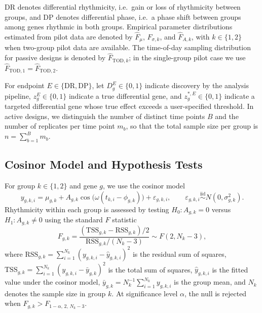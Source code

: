 \documentclass{article}
\begin{document}
DR denotes differential rhythmicity, i.e.\ gain or loss of rhythmicity between
groups, and DP denotes differential phase, i.e.\ a phase shift between groups
among genes rhythmic in both groups. Empirical parameter distributions
estimated from pilot data are denoted by $\hat{F}_\mu$,
$\hat{F}_{\sigma,k}$, and $\hat{F}_{A,k}$, with $k\in\{1,2\}$ when two-group
pilot data are available. The time-of-day sampling distribution for passive
designs is denoted by $\hat{F}_{\mathrm{TOD},k}$; in the single-group pilot
case we use $\hat{F}_{\mathrm{TOD},1}=\hat{F}_{\mathrm{TOD},2}$.

For endpoint $E\in\{\mathrm{DR},\mathrm{DP}\}$, let $D_g^E\in\{0,1\}$
indicate discovery by the analysis pipeline, $z_g^E\in\{0,1\}$ indicate a
true differential gene, and $z_g^{*,E}\in\{0,1\}$ indicate a targeted
differential gene whose true effect exceeds a user-specified threshold.
In active designs, we distinguish the number of distinct time points $B$ and
the number of replicates per time point $m_b$, so that the total sample size
per group is $n=\sum_{b=1}^B m_b.$

\subsection{Cosinor Model and Hypothesis Tests}
\label{sec:cosinor_tests}

For group $k\in\{1,2\}$ and gene $g$, we use the cosinor model
\begin{equation}
y_{g,k,i}
=
\mu_{g,k}
+
A_{g,k}\cos\!\bigl(\omega(t_{k,i}-\phi_{g,k})\bigr)
+
\varepsilon_{g,k,i},
\qquad
\varepsilon_{g,k,i}\overset{\text{iid}}{\sim}N(0,\sigma_{g,k}^2).
\label{eq:cosinor_model}
\end{equation}
Rhythmicity within each group is assessed by testing
$H_0:A_{g,k}=0$ versus $H_1:A_{g,k}\neq 0$ using the standard $F$ statistic
\begin{equation}
F_{g,k}
=
\frac{(\mathrm{TSS}_{g,k}-\mathrm{RSS}_{g,k})/2}
{\mathrm{RSS}_{g,k}/(N_k-3)}
\sim F(2,N_k-3),
\label{eq:rhythm_f_test}
\end{equation}
where $\mathrm{RSS}_{g,k}=\sum_{i=1}^{N_k}(y_{g,k,i}-\hat y_{g,k,i})^2$ is the
residual sum of squares, $\mathrm{TSS}_{g,k}=\sum_{i=1}^{N_k}(y_{g,k,i}-\bar
y_{g,k})^2$ is the total sum of squares, $\hat y_{g,k,i}$ is the fitted value
under the cosinor model, $\bar y_{g,k}=N_k^{-1}\sum_{i=1}^{N_k} y_{g,k,i}$ is
the group mean, and $N_k$ denotes the sample size in group $k$.
At significance level $\alpha$, the null is rejected when
$F_{g,k}>F_{1-\alpha,\,2,\,N_k-3}$.
\end{document}
